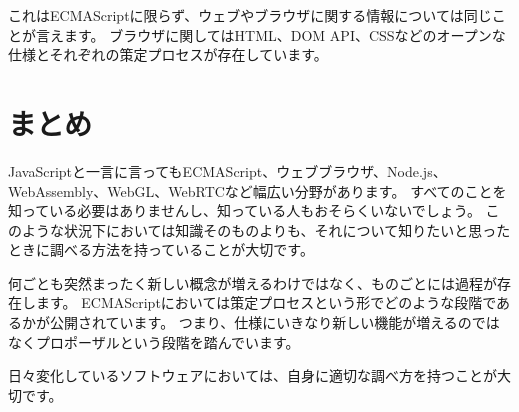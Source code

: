 これはECMAScriptに限らず、ウェブやブラウザに関する情報については同じことが言えます。
ブラウザに関してはHTML、DOM
API、CSSなどのオープンな仕様とそれぞれの策定プロセスが存在しています。

\hypertarget{ecmascript-summary}{%
\section{まとめ}\label{ecmascript-summary}}

JavaScriptと一言に言ってもECMAScript、ウェブブラウザ、Node.js、WebAssembly、WebGL、WebRTCなど幅広い分野があります。
すべてのことを知っている必要はありませんし、知っている人もおそらくいないでしょう。
このような状況下においては知識そのものよりも、それについて知りたいと思ったときに調べる方法を持っていることが大切です。

何ごとも突然まったく新しい概念が増えるわけではなく、ものごとには過程が存在します。
ECMAScriptにおいては策定プロセスという形でどのような段階であるかが公開されています。
つまり、仕様にいきなり新しい機能が増えるのではなくプロポーザルという段階を踏んでいます。

日々変化しているソフトウェアにおいては、自身に適切な調べ方を持つことが大切です。
